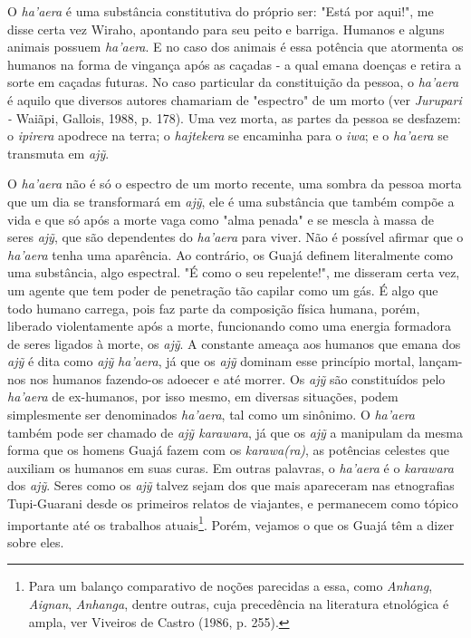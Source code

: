 O \emph{ha'aera} é uma substância constitutiva do próprio ser: "Está por
aqui!", me disse certa vez Wiraho, apontando para seu peito e barriga.
Humanos e alguns animais possuem \emph{ha'aera}. E no caso dos animais é
essa potência que atormenta os humanos na forma de vingança após as
caçadas - a qual emana doenças e retira a sorte em caçadas futuras. No
caso particular da constituição da pessoa, o \emph{ha'aera} é aquilo que
diversos autores chamariam de "espectro" de um morto (ver \emph{Jurupari
-} Waiãpi, Gallois, 1988, p. 178). Uma vez morta, as partes da pessoa se
desfazem: o \emph{ipirera} apodrece na terra; o \emph{hajtekera} se
encaminha para o \emph{iwa}; e o \emph{ha'aera} se transmuta em
\emph{ajỹ}.

O \emph{ha'aera} não é só o espectro de um morto recente, uma sombra da
pessoa morta que um dia se transformará em \emph{ajỹ}, ele é uma
substância que também compõe a vida e que só após a morte vaga como
"alma penada" e se mescla à massa de seres \emph{ajỹ}, que são
dependentes do \emph{ha'aera} para viver. Não é possível afirmar que o
\emph{ha'aera} tenha uma aparência. Ao contrário, os Guajá definem
literalmente como uma substância, algo espectral. "É como o seu
repelente!", me disseram certa vez, um agente que tem poder de
penetração tão capilar como um gás. É algo que todo humano carrega, pois
faz parte da composição física humana, porém, liberado violentamente
após a morte, funcionando como uma energia formadora de seres ligados à
morte, os \emph{ajỹ}. A constante ameaça aos humanos que emana dos
\emph{ajỹ} é dita como \emph{ajỹ} \emph{ha'aera}, já que os \emph{ajỹ}
dominam esse princípio mortal, lançam-nos nos humanos fazendo-os adoecer
e até morrer. Os \emph{ajỹ} são constituídos pelo \emph{ha'aera} de
ex-humanos, por isso mesmo, em diversas situações, podem simplesmente
ser denominados \emph{ha'aera}, tal como um sinônimo. O \emph{ha'aera}
também pode ser chamado de \emph{ajỹ karawara}, já que os \emph{ajỹ} a
manipulam da mesma forma que os homens Guajá fazem com os
\emph{karawa(ra)}, as potências celestes que auxiliam os humanos em suas
curas. Em outras palavras, o \emph{ha'aera} é o \emph{karawara} dos
\emph{ajỹ}. Seres como os \emph{ajỹ} talvez sejam dos que mais
apareceram nas etnografias Tupi-Guarani desde os primeiros relatos de
viajantes, e permanecem como tópico importante até os trabalhos
atuais\footnote{Para um balanço comparativo de noções parecidas a essa,
  como \emph{Anhang}, \emph{Aignan}, \emph{Anhanga}, dentre outras, cuja
  precedência na literatura etnológica é ampla, ver Viveiros de Castro
  (1986, p. 255).}. Porém, vejamos o que os Guajá têm a dizer sobre
eles.

